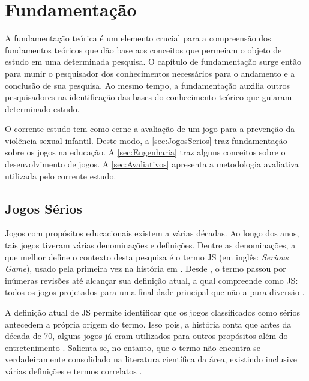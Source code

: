 \chapter{Fundamentação}\label{ch:Fundamentacao}

A fundamentação teórica é um elemento crucial para a compreensão dos fundamentos teóricos que dão base aos conceitos que permeiam o objeto de estudo em uma determinada pesquisa. O capítulo de fundamentação surge então para munir o pesquisador dos conhecimentos necessários para o andamento e a conclusão de sua pesquisa. Ao mesmo tempo, a fundamentação auxilia outros pesquisadores na identificação das bases do conhecimento teórico que guiaram determinado estudo. 

O corrente estudo tem como cerne a avaliação de um jogo para a prevenção da violência sexual infantil. Deste modo, a \autoref{sec:JogosSerios} traz fundamentação sobre os jogos na educação. A \autoref{sec:Engenharia} traz alguns conceitos sobre o desenvolvimento de jogos. A \autoref{sec:Avaliativos} apresenta a metodologia avaliativa utilizada pelo corrente estudo.

\vspace{1.0 cm}
\section{Jogos Sérios}\label{sec:JogosSerios}

Jogos com propósitos educacionais existem a várias décadas. Ao longo dos anos, tais jogos tiveram várias denominações e definições. Dentre as denominações, a que melhor define o contexto desta pesquisa é o termo \ac{JS} (em inglês: \textit{Serious Game}), usado pela primeira vez na história em \citeyear{clark1970serious} \cite{djaouti12011origins}. Desde \citeyear{clark1970serious}, o termo passou por inúmeras revisões até alcançar sua definição atual, a qual compreende como \ac{JS}: todos os jogos projetados para uma finalidade principal que não a pura diversão \cite{michael2005serious, laamarti2014overview, carvalho2015aprendizagem}.

A definição atual de \ac{JS} permite identificar que os jogos classificados como sérios antecedem a própria origem do termo. Isso pois, a história conta que antes da década de 70, alguns jogos já eram utilizados para outros propósitos além do entretenimento \cite{wilkinson2015brief}. Salienta-se, no entanto, que o termo não encontra-se verdadeiramente consolidado na literatura científica da área, existindo inclusive várias definições e termos correlatos \cite{pourabdollahian2012serious}.

